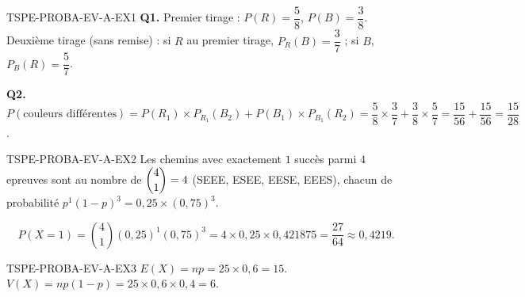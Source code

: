 %
\begin{corrige}{TSPE-PROBA-EV-A-EX1}
\textbf{Q1.} Premier tirage : $P(R)=\dfrac{5}{8}$, $P(B)=\dfrac{3}{8}$. Deuxième tirage (sans remise) : si $R$ au premier tirage, $P_R(B)=\dfrac{3}{7}$ ; si $B$, $P_B(R)=\dfrac{5}{7}$.

\textbf{Q2.} $P(\text{couleurs différentes}) = P(R_1)\times P_{R_1}(B_2) + P(B_1)\times P_{B_1}(R_2) = \dfrac{5}{8}\times\dfrac{3}{7}+\dfrac{3}{8}\times\dfrac{5}{7} = \dfrac{15}{56}+\dfrac{15}{56} = \boxed{\dfrac{15}{28}}$.
\end{corrige}

\begin{corrige}{TSPE-PROBA-EV-A-EX2}
Les chemins avec exactement $1$ succès parmi $4$ epreuves sont au nombre de $\dbinom{4}{1}=4$ (SEEE, ESEE, EESE, EEES), chacun de probabilité $p^1(1-p)^3 = 0{,}25\times(0{,}75)^3$.

\[
  P(X=1) = \binom{4}{1}(0{,}25)^1(0{,}75)^3 = 4\times0{,}25\times0{,}421875 = \boxed{\dfrac{27}{64}} \approx 0{,}4219.
\]
\end{corrige}

\begin{corrige}{TSPE-PROBA-EV-A-EX3}
$E(X) = np = 25\times0{,}6 = \boxed{15}$. $V(X) = np(1-p) = 25\times0{,}6\times0{,}4 = \boxed{6}$.
\end{corrige}

